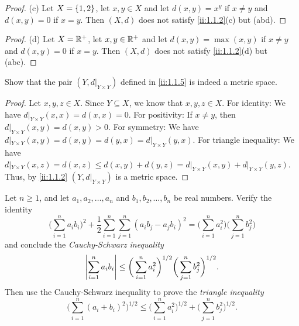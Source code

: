 \begin{proof}{(c)}
  Let \(X = \left\lbrace1, 2\right\rbrace\), let \(x, y \in X\) and let \(d(x, y) = x^y\) if \(x \neq y\) and \(d(x, y) = 0\) if \(x = y\).
  Then \((X, d)\) does not satisfy \cref{ii:1.1.2}(c) but (abd).
\end{proof}

\begin{proof}{(d)}
  Let \(X = \mathbb{R}^+\), let \(x, y \in \mathbb{R}^+\) and let \(d(x, y) = \max(x, y)\) if \(x \neq y\) and \(d(x, y) = 0\) if \(x = y\).
  Then \((X, d)\) does not satisfy \cref{ii:1.1.2}(d) but (abc).
\end{proof}

\begin{ex}\label{ii:ex:1.1.4}
  Show that the pair \((Y, d|_{Y \times Y})\) defined in \cref{ii:1.1.5} is indeed a metric space.
\end{ex}

\begin{proof}
  Let \(x, y, z \in X\).
  Since \(Y \subseteq X\), we know that \(x, y, z \in X\).
  For identity:
  We have \(d|_{Y \times Y}(x, x) = d(x, x) = 0\).
  For positivity:
  If \(x \neq y\), then \(d|_{Y \times Y}(x, y) = d(x, y) > 0\).
  For symmetry:
  We have \(d|_{Y \times Y}(x, y) = d(x, y) = d(y, x) = d|_{Y \times Y}(y, x)\).
  For triangle inequality:
  We have \(d|_{Y \times Y}(x, z) = d(x, z) \leq d(x, y) + d(y, z) = d|_{Y \times Y}(x, y) + d|_{Y \times Y}(y, z)\).
  Thus, by \cref{ii:1.1.2} \((Y, d|_{Y \times Y})\) is a metric space.
\end{proof}

\begin{ex}\label{ii:ex:1.1.5}
  Let \(n \geq 1\), and let \(a_1, a_2, \dots, a_n\) and \(b_1, b_2, \dots, b_n\) be real numbers.
  Verify the identity
  \[
    \bigg(\sum_{i = 1}^n a_i b_i\bigg)^2 + \dfrac{1}{2} \sum_{i = 1}^n \sum_{j = 1}^n (a_i b_j - a_j b_i)^2 = \bigg(\sum_{i = 1}^n a_i^2\bigg) \bigg(\sum_{j = 1}^n b_j^2\bigg)
  \]
  and conclude the \emph{Cauchy-Schwarz inequality}
  \[
    \left\lvert\sum_{i = 1}^n a_i b_i\right\rvert \leq \bigg(\sum_{i = 1}^n a_i^2\bigg)^{1 / 2} \bigg(\sum_{j = 1}^n b_j^2\bigg)^{1 / 2}.
  \]
  Then use the Cauchy-Schwarz inequality to prove the \emph{triangle inequality}
  \[
    \bigg(\sum_{i = 1}^n (a_i + b_i)^2\bigg)^{1 / 2} \leq \bigg(\sum_{i = 1}^n a_i^2\bigg)^{1 / 2} + \bigg(\sum_{j = 1}^n b_j^2\bigg)^{1 / 2}.
  \]
\end{ex}

